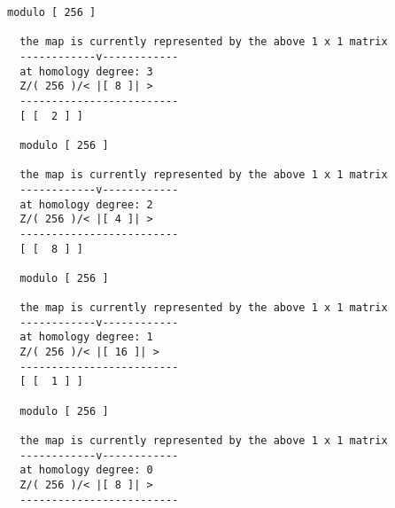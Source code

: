\documentclass[a4paper,11pt]{report}
\begin{document}
{{{\begin{Verbatim}[commandchars=!@F,fontsize=\small,frame=single,label=Example]
  modulo [ 256 ]
  
  the map is currently represented by the above 1 x 1 matrix
  ------------v------------
  at homology degree: 3
  Z/( 256 )/< |[ 8 ]| >
  -------------------------
  [ [  2 ] ]
  
  modulo [ 256 ]
  
  the map is currently represented by the above 1 x 1 matrix
  ------------v------------
  at homology degree: 2
  Z/( 256 )/< |[ 4 ]| >
  -------------------------
  [ [  8 ] ]
  
  modulo [ 256 ]
  
  the map is currently represented by the above 1 x 1 matrix
  ------------v------------
  at homology degree: 1
  Z/( 256 )/< |[ 16 ]| >
  -------------------------
  [ [  1 ] ]
  
  modulo [ 256 ]
  
  the map is currently represented by the above 1 x 1 matrix
  ------------v------------
  at homology degree: 0
  Z/( 256 )/< |[ 8 ]| >
  -------------------------
\end{Verbatim}
 }

 }

  }

   
\end{document}
